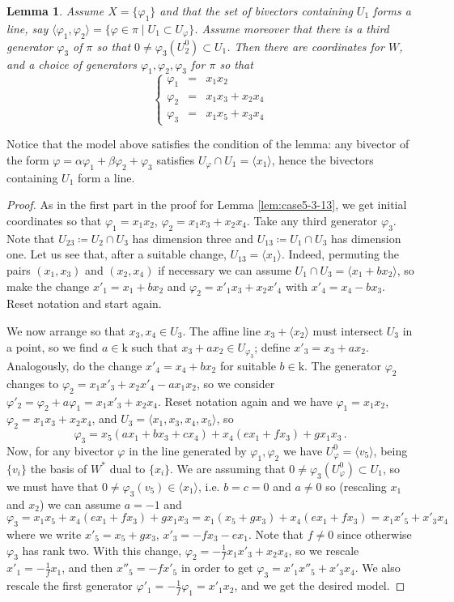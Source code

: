 \documentclass[10pt,reqno]{amsart}
\newcommand{\la}{\langle}
\newcommand{\ra}{\rangle}
\renewcommand{\a}{\alpha}
\renewcommand{\b}{\beta}
\newcommand{\f}{\varphi}
\newcommand{\kk}{\mathrm{k}}
\newtheorem{lemma}[theorem]{Lemma}
\theoremstyle{definition}
\begin{document}
\begin{lemma}\label{lem:case5-3-14}
Assume $X=\{\f_1\}$ and that the set of bivectors containing $U_1$ forms a line, say $\langle \f_1, \f_2 \rangle =\{\f \in \pi \mid U_1\subset U_\f\}$. Assume moreover that there is a third generator $\f_3$ of $\pi$ so that $0 \ne \f_3(U^0_2) \subset U_1$. Then there are coordinates for $W$, and a choice of generators $\f_1, \f_2, \f_3$ for $\pi$ so that
\[ 
\left\{\begin{array}{ccl}
 \f_1 & = & x_1x_2\\
 \f_2 & = & x_1x_3+x_2x_4\\
 \f_3 & = & x_1x_5+x_3x_4
\end{array}\right.
\]
\end{lemma}

\noindent Notice that the model above satisfies the condition of the lemma: any bivector of the form $\f=\a\f_1+\b\f_2 + \f_3$ satisfies $U_{\f} \cap U_1=\la x_1 \ra$, hence the bivectors containing $U_1$ form a line.
\begin{proof}
As in the first part in the proof for Lemma \ref{lem:case5-3-13}, we get initial coordinates so that $\f_1=x_1x_2$, $\f_2=x_1x_3+x_2x_4$. Take any third generator $\f_3$. Note that $U_{23}\coloneqq U_2\cap U_3$ has dimension three and $U_{13}\coloneqq U_1\cap U_3$ has dimension one. Let us see that, after a suitable change, $U_{13}=\la x_1 \ra$. Indeed, permuting the pairs $(x_1,x_3)$ and $(x_2,x_4)$ if necessary we can assume $U_1 \cap U_3=\la x_1+bx_2 \ra$, so make the change $x'_1=x_1+bx_2$ and $\f_2=x'_1x_3+x_2x'_4$ with $x'_4=x_4-bx_3$. Reset notation and start again.

\noindent We now arrange so that $x_3, x_4 \in U_3$. The affine line $x_3 + \la x_2 \ra$ must intersect $U_3$ in a point, so we find $a\in\kk$ such that $x_3+ax_2 \in U_{\f_3}$; define $x'_3=x_3+ax_2$. Analogously, do the change $x'_4=x_4+bx_2$ for suitable $b\in\kk$. The generator $\f_2$ changes to $\f_2=x_1x'_3+x_2x'_4-ax_1x_2$, so we consider $\f'_2=\f_2+a\f_1=x_1x'_3+x_2x_4$. Reset notation again and we have $\f_1=x_1x_2$, $\f_2=x_1x_3+x_2x_4$, and $U_3=\la x_1, x_3,x_4,x_5 \ra$, so
\[
\f_3=x_5(ax_1+bx_3+cx_4)+x_4(ex_1+fx_3)+gx_1x_3 \, .
\]
Now, for any bivector $\f$ in the line generated by $\f_1, \f_2$ we have $U_{\f}^0=\langle v_5 \rangle$, being $\{v_i\}$ the basis of $W^*$ dual to $\{x_i\}$. We are assuming that $0 \ne \f_3(U_{\f}^0) \subset U_1$, so we must have that $0 \ne \f_3(v_5) \in \langle x_1 \rangle$, i.e. $b=c=0$ and $a \ne 0$ so (rescaling $x_1$ and $x_2$) we can assume $a=-1$ and 
\[
\f_3=x_1x_5+x_4(ex_1+fx_3)+gx_1x_3=x_1(x_5+gx_3)+x_4(ex_1+fx_3)=x_1x'_5+x'_3x_4
\]
where we write $x'_5=x_5+gx_3$, $x'_3=-fx_3-ex_1$. Note that $f \ne 0$ since otherwise $\f_3$ has rank two. With this change, $\f_2=-\frac1f x_1x'_3+x_2x_4$, so we rescale $x'_1=-\frac1f x_1$, and then $x''_5=-f x'_5$ in order to get $\f_3=x'_1x''_5+x'_3x_4$. We also rescale the first generator $\f'_1=-\frac1f \f_1=x'_1x_2$, and we get the desired model.
\end{proof}
\end{document}
